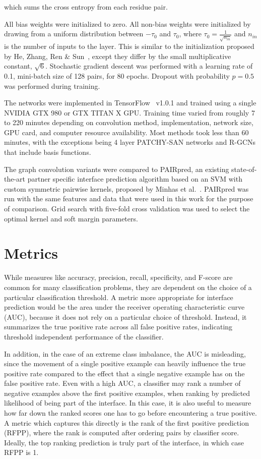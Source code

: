 \noindent
which sums the cross entropy from each residue pair.


All bias weights were initialized to zero.
All non-bias weights were initialized by drawing from a uniform distribution between $-\tau_0$ and $\tau_0$, where $\tau_0=\frac{1}{\sqrt{n_{in}}}$ and $n_{in}$ is the number of inputs to the layer.
This is similar to the initialization proposed by He, Zhang, Ren \& Sun~\cite{he2015}, except they differ by the small multiplicative constant, $\sqrt{6}$.
Stochastic gradient descent was performed with a learning rate of 0.1, mini-batch size of 128 pairs, for 80 epochs.
Dropout with probability $p=0.5$ was performed during training.

The networks were implemented in TensorFlow~\cite{abadi2015} v1.0.1 and trained using a single NVIDIA GTX 980 or GTX TITAN X GPU.
Training time varied from roughly 7 to 220 minutes depending on convolution method, implementation, network size, GPU card, and computer resource availability.
Most methods took less than 60 minutes, with the exceptions being 4 layer PATCHY-SAN networks and R-GCNs that include basis functions.


The graph convolution variants were compared to PAIRpred, an existing state-of-the-art partner specific interface prediction algorithm based on an SVM with custom symmetric pairwise kernels, proposed by Minhas et al.~\cite{minhas2014}.
PAIRpred was run with the same features and data that were used in this work for the purpose of comparison.
Grid search with five-fold cross validation was used to select the optimal kernel and soft margin parameters.



\section{Metrics}

While measures like accuracy, precision, recall, specificity, and F-score are common for many classification problems, they are dependent on the choice of a particular classification threshold.
A metric more appropriate for interface prediction would be the area under the receiver operating characteristic curve (AUC), because it does not rely on a particular choice of threshold.
Instead, it summarizes the true positive rate across all false positive rates, indicating threshold independent performance of the classifier.

In addition, in the case of an extreme class imbalance, the AUC is misleading, since the movement of a single positive example can heavily influence the true positive rate compared to the effect that a single negative example has on the false positive rate.
Even with a high AUC, a classifier may rank a number of negative examples above the first positive examples, when ranking by predicted likelihood of being part of the interface.
In this case, it is also useful to measure how far down the ranked scores one has to go before encountering a true positive.
A metric which captures this directly is the rank of the first positive prediction (RFPP), where the rank is computed after ordering pairs by classifier score.
Ideally, the top ranking prediction is truly part of the interface, in which case RFPP is 1.

